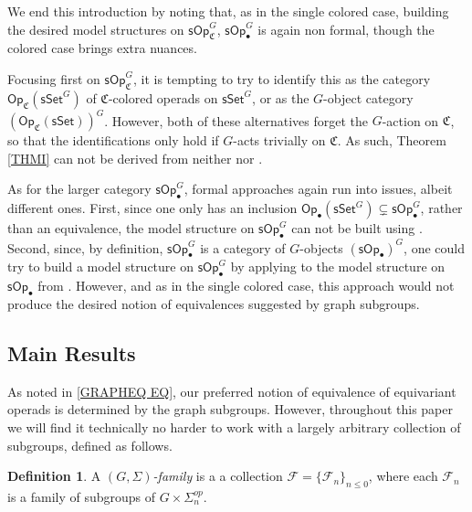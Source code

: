 \documentclass[a4paper,10pt
,draft
]{article}%
\numberwithin{equation}{section}
\numberwithin{figure}{section}
\theoremstyle{definition} %
\newtheorem{definition}[equation]{Definition}%
\newcommand{\1}{\ensuremath{\mathbbm 1}}%
\begin{document}
We end this introduction by noting that, 
as in the single colored case,
building the desired model structures on 
$\mathsf{sOp}^G_{\mathfrak C}$, $\mathsf{sOp}^G_{\bullet}$
is again non formal, 
though the colored case brings extra nuances.

Focusing first on
$\mathsf{sOp}^G_{\mathfrak C}$,
it is tempting to try to identify this as
the category
$\mathsf{Op}_{\mathfrak C}(\mathsf{sSet}^G)$
of $\mathfrak{C}$-colored operads on $\mathsf{sSet}^G$,
or as the $G$-object category
$\left(\mathsf{Op}_{\mathfrak C}(\mathsf{sSet})\right)^G$.
However, both of these alternatives forget the 
$G$-action on $\mathfrak C$,
so that the identifications only hold if 
$G$-acts trivially on $\mathfrak{C}$.
As such, Theorem \ref{THMI}
can not be derived from neither 
\cite[Thm. 3.2]{BM03} nor \cite[Prop. 2.6]{Ste16}.

As for the larger category
$\mathsf{sOp}^G_{\bullet}$,
formal approaches again run into issues, albeit different ones.
First, since one only has an inclusion
$\mathsf{Op}_{\bullet}(\mathsf{sSet}^G)
\subsetneq \mathsf{sOp}_{\bullet}^G$,
rather than an equivalence,
the model structure on $\mathsf{sOp}_{\bullet}^G$
can not be built using \cite{Cav}.
Second, since, by definition,
$\mathsf{sOp}^G_{\bullet}$
is a category of $G$-objects
$\left(\mathsf{sOp}_{\bullet}\right)^G$,
one could try to build a model structure
on $\mathsf{sOp}^G_{\bullet}$
by applying \cite[Prop. 2.6]{Ste16}
to the model structure on $\mathsf{sOp}_\bullet$ from \cite{Cav}.
However, and as in the single colored case,
this approach would not produce
the desired notion of equivalences suggested by graph subgroups.








\subsection{Main Results}


As noted in \eqref{GRAPHEQ EQ},
our preferred notion of equivalence of equivariant operads is determined by the graph subgroups.
However, throughout this paper we will find it technically 
no harder to work with a largely arbitrary collection of subgroups,
defined as follows.


\begin{definition}\label{FAM1ST DEF}
	A \emph{$(G,\Sigma)$-family} is a
	a collection
	$\mathcal{F} = \{\mathcal{F}_n\}_{n \leq 0}$,
	where each $\mathcal{F}_n$
	is a family of subgroups of $G \times \Sigma_n^{op}$.
\end{definition}
\end{document}
